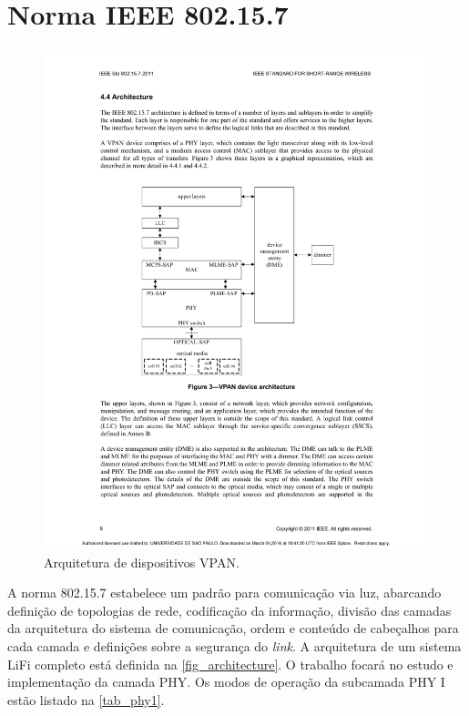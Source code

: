 	\section{Norma IEEE 802.15.7}\label{sec-norma}
	\begin{figure}[htb]
		\caption{\label{fig_architecture}Arquitetura de dispositivos VPAN.}
		\centering
		\includegraphics[width=0.5\textheight,trim={5cm 9.6cm 5.3cm 7cm}, clip]{pag31.pdf}
	\end{figure}

	A norma 802.15.7 estabelece um padrão para comunicação via luz, abarcando definição de topologias de rede, codificação da informação, divisão das camadas da arquitetura do sistema de comunicação, ordem e conteúdo de cabeçalhos para cada camada e definições sobre a segurança do \textit{link}. A arquitetura de um sistema LiFi completo está definida na \autoref{fig_architecture}. 
	O trabalho focará no estudo e implementação da camada PHY. Os modos de operação da subcamada PHY I estão listado na \autoref{tab_phy1}.
	
